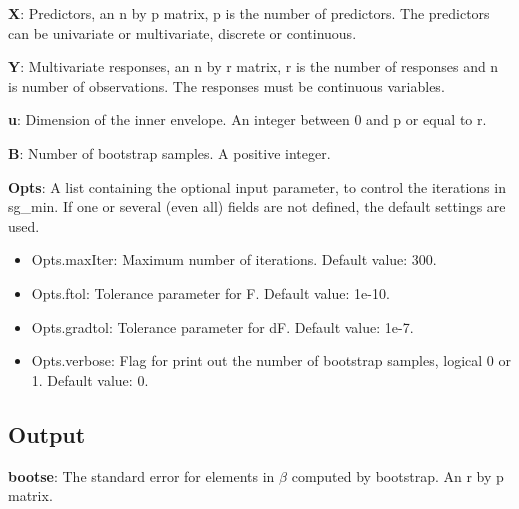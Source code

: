\documentclass[a4paper,11pt,openany]{memoir}
\begin{document}
\begin{par}
\textbf{X}: Predictors, an n by p matrix, p is the number of predictors.  The predictors can be univariate or multivariate, discrete or continuous.
\end{par} \vspace{1em}
\begin{par}
\textbf{Y}: Multivariate responses, an n by r matrix, r is the number of responses and n is number of observations.  The responses must be continuous variables.
\end{par} \vspace{1em}
\begin{par}
\textbf{u}: Dimension of the inner envelope. An integer between 0 and p or equal to r.
\end{par} \vspace{1em}
\begin{par}
\textbf{B}: Number of bootstrap samples.  A positive integer.
\end{par} \vspace{1em}
\begin{par}
\textbf{Opts}: A list containing the optional input parameter, to control the iterations in sg\_min. If one or several (even all) fields are not defined, the default settings are used.
\end{par} \vspace{1em}
\begin{itemize}
\setlength{\itemsep}{-1ex}
   \item Opts.maxIter: Maximum number of iterations.  Default value: 300.
   \item Opts.ftol: Tolerance parameter for F.  Default value: 1e-10.
   \item Opts.gradtol: Tolerance parameter for dF.  Default value: 1e-7.
   \item Opts.verbose: Flag for print out the number of bootstrap samples, logical 0 or 1. Default value: 0.
\end{itemize}


\subsection*{Output}

\begin{par}
\textbf{bootse}: The standard error for elements in $\beta$ computed by bootstrap.  An r by p matrix.
\end{par} \vspace{1em}
\end{document}

